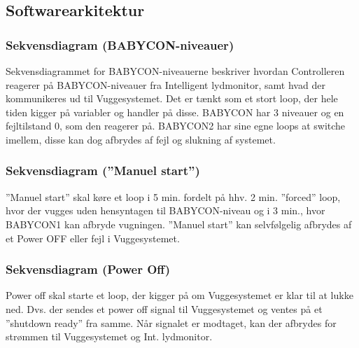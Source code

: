 \subsection{Softwarearkitektur}

\subsubsection{Sekvensdiagram (BABYCON-niveauer)}


Sekvensdiagrammet for BABYCON-niveauerne beskriver hvordan Controlleren reagerer på BABYCON-niveauer fra Intelligent lydmonitor, samt hvad der kommunikeres ud til Vuggesystemet.
Det er tænkt som et stort loop, der hele tiden kigger på variabler og handler på disse. BABYCON har 3 niveauer og en fejltilstand 0, som den reagerer på. BABYCON2 har sine egne loops at switche imellem, disse kan dog afbrydes af fejl og slukning af systemet.

\subsubsection{Sekvensdiagram (''Manuel start'')}


''Manuel start'' skal køre et loop i 5 min. fordelt på hhv. 2 min. ''forced'' loop, hvor der vugges uden hensyntagen til BABYCON-niveau og i 3 min., hvor BABYCON1 kan afbryde vugningen. ''Manuel start'' kan selvfølgelig afbrydes af et Power OFF eller fejl i Vuggesystemet.

\subsubsection{Sekvensdiagram (Power Off)}


Power off skal starte et loop, der kigger på om Vuggesystemet er klar til at lukke ned. Dvs. der sendes et power off signal til Vuggesystemet og ventes på et ''shutdown ready'' fra samme. Når signalet er modtaget, kan der afbrydes for strømmen til Vuggesystemet og Int. lydmonitor.  

